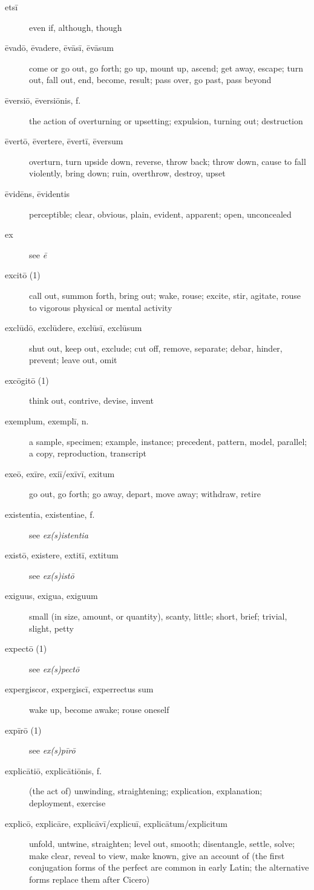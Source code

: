 \begin{description}
    \item[etsī] even if, although, though
    \item[ēvadō, ēvadere, ēvāsī, ēvāsum] come or go out, go forth; go up, mount up, ascend; get away, escape; turn out, fall out, end, become, result; pass over, go past, pass beyond
    \item[ēversiō, ēversiōnis, f.] the action of overturning or upsetting; expulsion, turning out; destruction
    \item[ēvertō, ēvertere, ēvertī, ēversum] overturn, turn upside down, reverse, throw back; throw down, cause to fall violently, bring down; ruin, overthrow, destroy, upset
    \item[ēvidēns, ēvidentis] perceptible; clear, obvious, plain, evident, apparent; open, unconcealed
    \item[ex] see \textit{ē}
    \item[excitō (1)] call out, summon forth, bring out; wake, rouse; excite, stir, agitate, rouse to vigorous physical or mental activity
    \item[exclūdō, exclūdere, exclūsī, exclūsum] shut out, keep out, exclude; cut off, remove, separate; debar, hinder, prevent; leave out, omit
    \item[excōgitō (1)] think out, contrive, devise, invent
    \item[exemplum, exemplī, n.] \marginnote{*}a sample, specimen; example, instance; precedent, pattern, model, parallel; a copy, reproduction, transcript
    \item[exeō, exīre, exiī/exīvī, exitum] \marginnote{*}go out, go forth; go away, depart, move away; withdraw, retire
    \item[existentia, existentiae, f.] see \textit{ex(s)istentia}
    \item[existō, existere, extitī, extitum] see \textit{ex(s)istō}
    \item[exiguus, exigua, exiguum] small (in size, amount, or quantity), scanty, little; short, brief; trivial, slight, petty
    \item[expectō (1)] see \textit{ex(s)pectō}
    \item[expergiscor, expergiscī, experrectus sum] wake up, become awake; rouse oneself
    \item[expīrō (1)] see \textit{ex(s)pīrō}
    \item[explicātiō, explicātiōnis, f.] (the act of) unwinding, straightening; explication, explanation; deployment, exercise
    \item[explicō, explicāre, explicāvī/explicuī, explicātum/explicitum] unfold, untwine, straighten; level out, smooth; disentangle, settle, solve; make clear, reveal to view, make known, give an account of (the first conjugation forms of the perfect are common in early Latin; the alternative forms replace them after Cicero)

\end{description}
